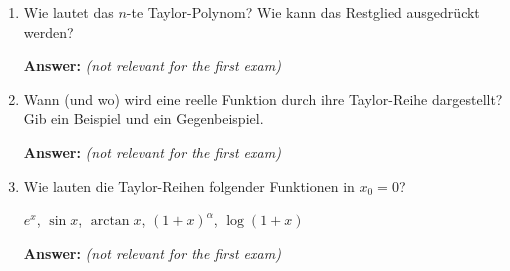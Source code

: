 \documentclass[11pt]{article}
\begin{document}
\begin{enumerate}
    \item Wie lautet das $n$-te Taylor-Polynom? Wie kann das Restglied ausgedrückt werden?
    
    \textbf{Answer:} \textit{(not relevant for the first exam)}
    \item Wann (und wo) wird eine reelle Funktion durch ihre Taylor-Reihe dargestellt? Gib ein Beispiel und ein Gegenbeispiel.
    
    \textbf{Answer:} \textit{(not relevant for the first exam)}
    \item Wie lauten die Taylor-Reihen folgender Funktionen in $x_0 = 0$?
    \begin{center}
        $e^x$, $\sin{x}$, $\arctan{x}$, $(1+x)^\alpha$, $\log(1+x)$
    \end{center}

    \textbf{Answer:} \textit{(not relevant for the first exam)}
\end{enumerate}
\end{document}
